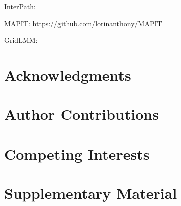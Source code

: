 \documentclass[12pt, a4paper]{article}
\begin{document}
InterPath: \url{}

MAPIT: \url{https://github.com/lorinanthony/MAPIT}

GridLMM: 

\section{Acknowledgments}\label{InterPath-Acknowledgments}

\section{Author Contributions}\label{InterPath-Author-Contributions}

\section{Competing Interests}\label{InterPath-Competing-Interests}

\begingroup


\endgroup

\clearpage
\section{Supplementary Material}



%
%

\end{document}

